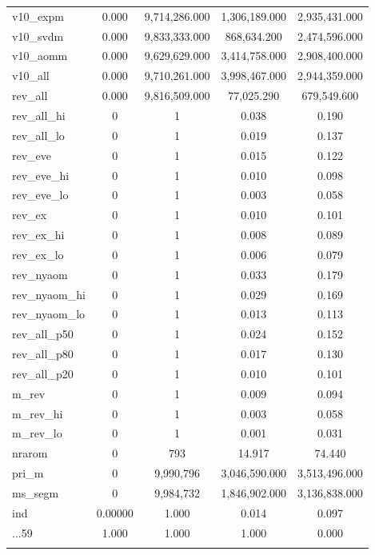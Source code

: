 \documentclass[11pt,]{article}
\begin{document}
\begin{table}[!htbp]
\begin{tabular}{@{\extracolsep{5pt}}lcccc}
v10\_expm & 0.000 & 9,714,286.000 & 1,306,189.000 & 2,935,431.000 \\ 
v10\_svdm & 0.000 & 9,833,333.000 & 868,634.200 & 2,474,596.000 \\ 
v10\_aomm & 0.000 & 9,629,629.000 & 3,414,758.000 & 2,908,400.000 \\ 
v10\_all & 0.000 & 9,710,261.000 & 3,998,467.000 & 2,944,359.000 \\ 
rev\_all & 0.000 & 9,816,509.000 & 77,025.290 & 679,549.600 \\ 
rev\_all\_hi & 0 & 1 & 0.038 & 0.190 \\ 
rev\_all\_lo & 0 & 1 & 0.019 & 0.137 \\ 
rev\_eve & 0 & 1 & 0.015 & 0.122 \\ 
rev\_eve\_hi & 0 & 1 & 0.010 & 0.098 \\ 
rev\_eve\_lo & 0 & 1 & 0.003 & 0.058 \\ 
rev\_ex & 0 & 1 & 0.010 & 0.101 \\ 
rev\_ex\_hi & 0 & 1 & 0.008 & 0.089 \\ 
rev\_ex\_lo & 0 & 1 & 0.006 & 0.079 \\ 
rev\_nyaom & 0 & 1 & 0.033 & 0.179 \\ 
rev\_nyaom\_hi & 0 & 1 & 0.029 & 0.169 \\ 
rev\_nyaom\_lo & 0 & 1 & 0.013 & 0.113 \\ 
rev\_all\_p50 & 0 & 1 & 0.024 & 0.152 \\ 
rev\_all\_p80 & 0 & 1 & 0.017 & 0.130 \\ 
rev\_all\_p20 & 0 & 1 & 0.010 & 0.101 \\ 
m\_rev & 0 & 1 & 0.009 & 0.094 \\ 
m\_rev\_hi & 0 & 1 & 0.003 & 0.058 \\ 
m\_rev\_lo & 0 & 1 & 0.001 & 0.031 \\ 
nrarom & 0 & 793 & 14.917 & 74.440 \\ 
pri\_m & 0 & 9,990,796 & 3,046,590.000 & 3,513,496.000 \\ 
ms\_segm & 0 & 9,984,732 & 1,846,902.000 & 3,136,838.000 \\ 
ind & 0.00000 & 1.000 & 0.014 & 0.097 \\ 
...59 & 1.000 & 1.000 & 1.000 & 0.000 \\ 
\hline \\[-1.8ex] 
\end{tabular} 
\end{table}

\restoregeometry
\end{document}
